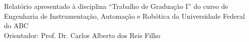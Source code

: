   \begin{center}
  \thispagestyle{empty}
   {\large \textbf{\theauthor}} \\[6cm]



   {\Large \thetitle}\\[6cm]

   \hspace{.25\textwidth} %
   \begin{minipage}{.7\textwidth}
   \large Relatório apresentado à disciplina “Trabalho de
   Graduação I” do curso de Engenharia
   de Instrumentação, Automação e Robótica da Universidade Federal do
   ABC
   \\[1cm]
   Orientador: Prof. Dr. Carlos Alberto dos Reis Filho
  \end{minipage}
  \vfill
  

\vspace{2cm}

\large \textbf{\local}

\large \textbf{\thedate}
\end{center}
\newpage
